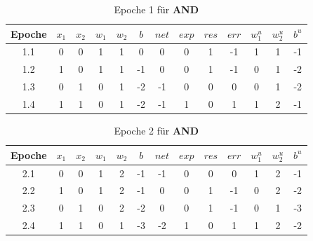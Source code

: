 \setlength{\tabcolsep}{0.8em}
\begin{table} %
    \centering
    \begin{tabular}{c | c | c | c | c | c | c | c | c | c | c | c | c}
        Epoche & $x_1$ & $x_2$ & $w_1$ & $w_2$ & $b$ & $net$ & $exp$ & $res$ & $err$ & $w^u_1$ & $w^u_2$ & $b^u$ \\
        \hline
        1.1& 0     & 0     & 1     & 1     & 0   & 0     & 0     & 1     & -1  & 1       & 1       & -1 \\
        1.2& 1     & 0     & 1     & 1     & -1  & 0     & 0     & 1     & -1  & 0       & 1       & -2 \\
        1.3& 0     & 1     & 0     & 1     & -2  & -1    & 0     & 0     & 0   & 0       & 1       & -2 \\
        1.4& 1     & 1     & 0     & 1     & -2  & -1    & 1     & 0     & 1   & 1       & 2       & -1 \\
    \end{tabular}
    \caption{Epoche 1 für \textbf{AND}}
    \label{tab:mcp-andep1}
\end{table}

\setlength{\tabcolsep}{0.8em}
\begin{table} %
    \centering
    \begin{tabular}{c | c | c | c | c | c | c | c | c | c | c | c | c}
        Epoche & $x_1$ & $x_2$ & $w_1$ & $w_2$ & $b$ & $net$ & $exp$ & $res$ & $err$ & $w^u_1$ & $w^u_2$ & $b^u$ \\
        \hline
        2.1& 0     & 0     & 1     & 2     & -1  & -1    & 0     & 0     & 0   & 1       & 2       & -1    \\
        2.2& 1     & 0     & 1     & 2     & -1  & 0     & 0     & 1     & -1  & 0       & 2       & -2    \\
        2.3& 0     & 1     & 0     & 2     & -2  & 0     & 0     & 1     & -1  & 0       & 1       & -3    \\
        2.4& 1     & 1     & 0     & 1     & -3  & -2    & 1     & 0     & 1   & 1       & 2       & -2    \\
    \end{tabular}
    \caption{Epoche 2 für \textbf{AND}}
    \label{tab:mcp-andep2}
\end{table}

